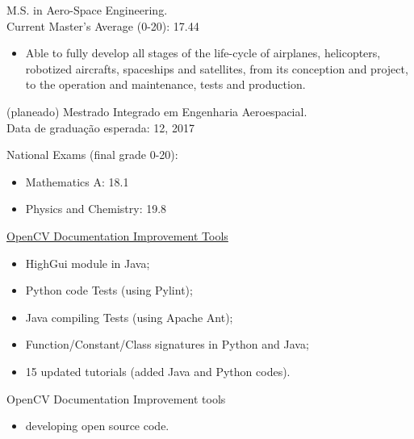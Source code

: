 \documentclass{article}
\begin{document}
\begin{llist}
 
{
M.S. in Aero-Space Engineering.\\
Current Master's Average (0-20): 17.44

\begin{itemize}
\item[\textendash] Able to fully develop all stages of the life-cycle of airplanes, helicopters, robotized aircrafts, spaceships and satellites, from its conception and project, to the operation and maintenance, tests and production.
\end{itemize}
}
{
(planeado) Mestrado Integrado em Engenharia Aeroespacial.\\
Data de gradua\c{c}\~{a}o esperada: 12, 2017
}

 
National Exams (final grade 0-20):
\begin{itemize}
\item[\textendash] Mathematics A: 18.1
\item[\textendash] Physics and Chemistry: 19.8
\end{itemize}

{
}
{
}
\vspace{-0.33cm}

{
\href{https://summerofcode.withgoogle.com/projects/\#6351260335734784}{OpenCV Documentation Improvement Tools}
\vspace{-0.33cm}
\begin{itemize}
\item[\textendash] HighGui module in Java;
\item[\textendash] Python code Tests (using Pylint);
\item[\textendash] Java compiling Tests (using Apache Ant);
\item[\textendash] Function/Constant/Class signatures in Python and Java;
\item[\textendash] 15 updated tutorials (added Java and Python codes).
\end{itemize}
}
{
OpenCV Documentation Improvement tools
\vspace{-0.33cm}
\begin{itemize}
 \item developing open source code.
\end{itemize}
}


\end{llist}
\end{document}
